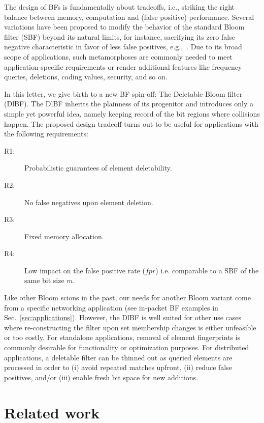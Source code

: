 \documentclass[conference]{IEEEtran}
\begin{document}
The design of BFs is fundamentally about tradeoffs, i.e., striking the right balance between memory, computation and (false positive) performance. 
Several variations have been proposed to modify the behavior of the standard Bloom filter (SBF) beyond its natural limits, 
for instance, sacrifying its zero false negative characteristic in favor of less false positives, e.g.,~\cite{1368454}. Due to its broad scope of applications, such metamorphoses are commonly needed to meet application-specific requirements or render additional features like frequency queries, deletions, coding values, security, and so on.

In this letter, we give birth to a new BF spin-off: The Deletable Bloom filter (DlBF). The DlBF inherits the plainness of its progenitor and introduces only a simple yet powerful idea, namely keeping record of the bit regions where collisions happen. The proposed design tradeoff turns out to be useful for applications with the following requirements:

\begin{description}
\item[R1:] Probabilistic guarantees of element deletability.
\item[R2:] No false negatives upon element deletion.
\item[R3:] Fixed memory allocation. \item[R4:] Low impact on the false positive rate ($fpr$) i.e. comparable to a SBF of the same bit size $m$. \end{description}





Like other Bloom scions in the past, our needs for another Bloom variant come from a specific networking application (see in-packet BF examples in Sec.~\ref{sec:applications}).  
However, the DlBF is well suited for other use cases where re-constructing the filter upon set membership changes is either unfeasible or too costly.
For standalone applications, removal of element fingerprints is commonly desirable for functionality or optimization purposes.
For distributed applications, a deletable filter can be thinned out as queried elements are processed in order to 
(i) avoid repeated matches upfront, 
(ii) reduce false positives, 
and/or (iii) enable fresh bit space for new additions.


\section{Related work}
\label{sec:related}
\end{document}
